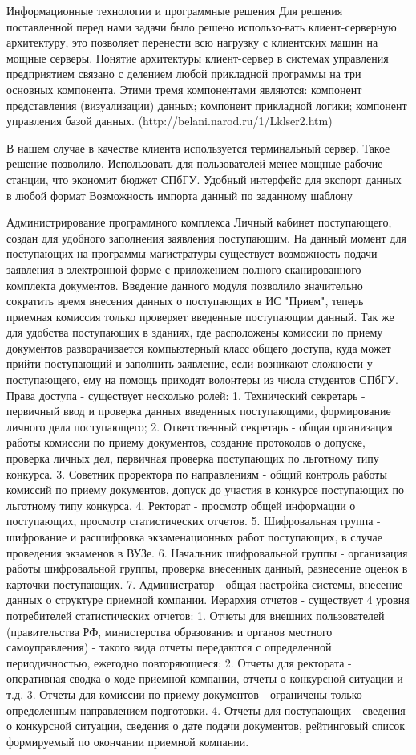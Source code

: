 \documentclass[12pt]{article}
\begin{document}
Информационные технологии и программные решения
Для решения поставленной перед нами задачи было решено использо-вать клиент-серверную архитектуру, это позволяет перенести всю нагрузку с клиентских машин на мощные серверы. Понятие архитектуры клиент-сервер в системах управления предприятием связано с делением любой прикладной программы на три основных компонента. Этими тремя компонентами являются:
компонент представления (визуализации) данных;
компонент прикладной логики;
компонент управления базой данных. (http://belani.narod.ru/1/Lklser2.htm)

В нашем случае в качестве клиента используется терминальный сервер.  Такое решение позволило. Использовать для пользователей менее мощные рабочие станции, что экономит бюджет СПбГУ.
Удобный интерфейс для экспорт данных в любой формат
Возможность импорта данный по заданному шаблону


Администрирование программного комплекса
Личный кабинет поступающего, создан для удобного заполнения заявления поступающим. На данный момент для поступающих на программы магистратуры существует возможность подачи заявления в электронной форме с приложением полного сканированного комплекта документов. Введение данного модуля позволило значительно сократить время внесения данных о поступающих в ИС "Прием", теперь приемная комиссия только проверяет введенные поступающим данный. Так же для удобства поступающих в зданиях, где расположены комиссии по приему документов разворачивается компьютерный класс общего доступа, куда может прийти поступающий и заполнить заявление, если возникают сложности у поступающего, ему на помощь приходят волонтеры из числа студентов СПбГУ.
Права доступа - существует несколько ролей:
1. Технический секретарь - первичный ввод и проверка данных введенных поступающими, формирование личного дела поступающего;
2. Ответственный секретарь - общая организация работы комиссии по приему документов, создание протоколов о допуске, проверка личных дел, первичная проверка поступающих по льготному типу конкурса.
3. Советник проректора по направлениям - общий контроль работы комиссий по приему документов, допуск до участия в конкурсе поступающих по льготному типу конкурса.
4. Ректорат - просмотр общей информации о поступающих, просмотр статистических отчетов.
5. Шифровальная группа - шифрование и расшифровка экзаменационных работ поступающих, в случае проведения экзаменов в ВУЗе.
6. Начальник шифровальной группы - организация работы шифровальной группы, проверка внесенных данный, разнесение оценок в карточки поступающих.
7. Администратор - общая настройка системы, внесение данных о структуре приемной компании.
Иерархия отчетов - существует 4 уровня потребителей статистических отчетов:
1. Отчеты для внешних пользователей (правительства РФ, министерства образования и органов местного самоуправления) - такого вида отчеты передаются с определенной периодичностью, ежегодно повторяющиеся;
2. Отчеты для ректората - оперативная сводка о ходе приемной компании, отчеты о конкурсной ситуации и т.д.
3. Отчеты для комиссии по приему документов - ограничены только определенным направлением подготовки.
4. Отчеты для поступающих - сведения о конкурсной ситуации, сведения о дате подачи документов, рейтинговый список формируемый по окончании приемной компании.
\end{document}
